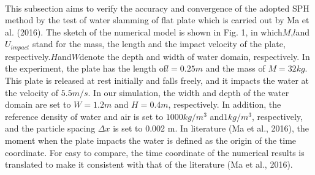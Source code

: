 \documentclass[UTF8]{ctexart}
\begin{document}
\paragraph{\quad}This subsection aims to verify the accuracy and convergence 
                of the adopted SPH method by the test of water slamming of 
                flat plate which is carried out by Ma et al. (2016). The sketch 
                of the numerical model is shown in Fig. 1, in which$ M$,$ l $and $U_{impact}$ 
                stand for the mass, the length and the impact velocity of the plate, 
                respectively.$ H $and$ W $denote the depth and width of water domain, 
                respectively. In the experiment, the plate has the length of$ l = 0.25 m$ 
                and the mass of $M = 32 kg$. This plate is released at rest initially and 
                falls freely, and it impacts the water at the velocity of $5.5 m/s$. In our 
                simulation, the width and depth of the water domain are set to $W = 1.2 m$ 
                and $H = 0.4 m$, respectively. In addition, the reference density of water 
                and air is set to $1000kg/m^3$ and$1kg/m^3$, respectively, and the particle 
                spacing $\Delta x$ is set to 0.002 m. In literature (Ma et al., 2016), the moment 
                when the plate impacts the water is defined as the origin of the time coordinate. 
                For easy to compare, the time coordinate of the numerical results is translated 
                to make it consistent with that of the literature (Ma et al., 2016).
\end{document}
